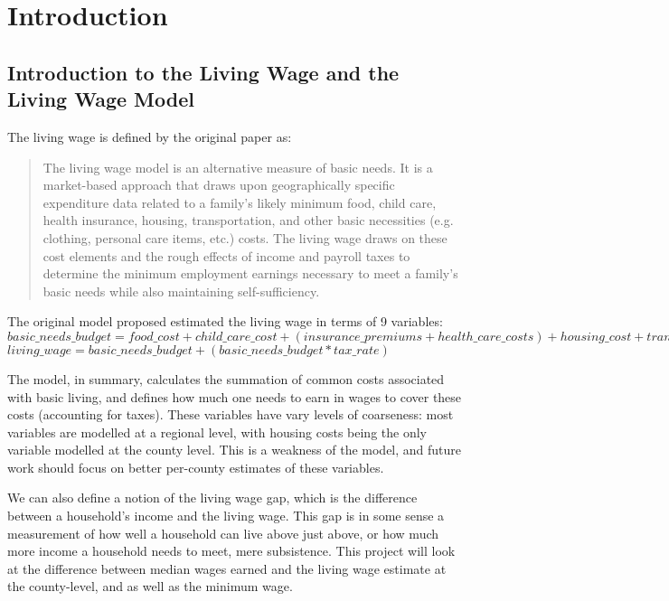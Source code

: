 \chapter{Introduction}\label{ch:introduction}

\section{Introduction to the Living Wage and the Living Wage Model}

The living wage is defined by the original paper\cite{glasmeier2014} as:

\begin{quote}
The living wage model is an alternative measure of basic needs. It is a market-based approach that draws upon geographically specific expenditure data related to a family's likely minimum food, child care, health insurance, housing, transportation, and other basic necessities (e.g. clothing, personal care items, etc.) costs. The living wage draws on these cost elements and the rough effects of income and payroll taxes to determine the minimum employment earnings necessary to meet a family's basic needs while also maintaining self-sufficiency.
\end{quote}

The original model proposed estimated the living wage in terms of 9 variables:
\newline
\newline
$basic\_needs\_budget = food\_cost + child\_care\_cost + ( insurance\_premiums + health\_care\_costs ) + housing\_cost + transportation\_cost + other\_necessities\_cost$
\newline
\newline
$living\_wage = basic\_needs\_budget + ( basic\_needs\_budget * tax\_rate )$
\newline

The model, in summary, calculates the summation of common costs associated with basic living, and defines how much one needs to earn in wages to cover these costs (accounting for taxes). These variables have vary levels of coarseness: most variables are modelled at a regional level, with housing costs being the only variable modelled at the county level. This is a weakness of the model, and future work should focus on better per-county estimates of these variables.

We can also define a notion of the living wage gap, which is the difference between a household's income and the living wage. This gap is in some sense a measurement of how well a household can live above just above, or how much more income a household needs to meet, mere subsistence.  This project will look at the difference between median wages earned and the living wage estimate at the county-level, and as well as the minimum wage.

